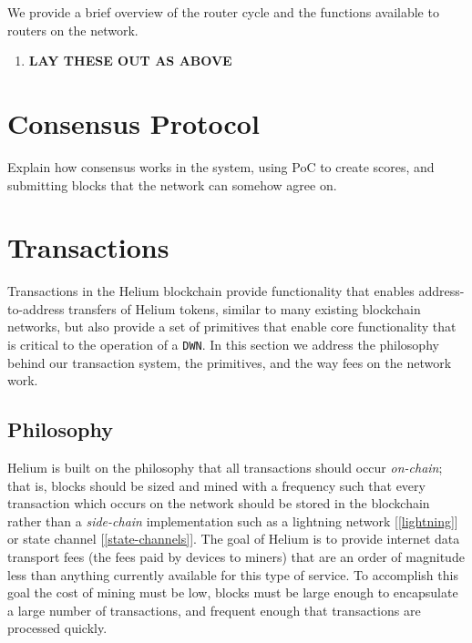 \documentclass[letterpaper,11pt]{article}
\begin{document}
We provide a brief overview of the router cycle and the functions available to routers on the network.

\begin{enumerate}
  \item \textbf{LAY THESE OUT AS ABOVE}
\end{enumerate}

\newpage

\section{Consensus Protocol} \label{consensus}

Explain how consensus works in the system, using PoC to create scores, and submitting blocks that the network can somehow agree on.

\newpage

\section{Transactions} \label{transactions}

Transactions in the Helium blockchain provide functionality that enables address-to-address transfers of Helium tokens, similar to many existing blockchain networks, but also provide a set of primitives that enable core functionality that is critical to the operation of a \verb|DWN|. In this section we address the philosophy behind our transaction system, the primitives, and the way fees on the network work.

\subsection{Philosophy}

Helium is built on the philosophy that all transactions should occur \textit{on-chain}; that is, blocks should be sized and mined with a frequency such that every transaction which occurs on the network should be stored in the blockchain rather than a \textit{side-chain} implementation such as a lightning network [\ref{lightning}] or state channel [\ref{state-channels}]. The goal of Helium is to provide internet data transport fees (the fees paid by devices to miners) that are an order of magnitude less than anything currently available for this type of service. To accomplish this goal the cost of mining must be low, blocks must be large enough to encapsulate a large number of transactions, and frequent enough that transactions are processed quickly.\newline
\end{document}
